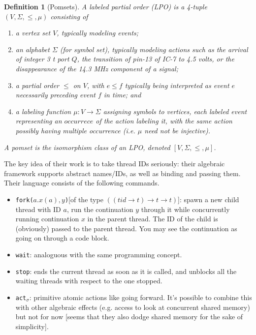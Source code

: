 \documentclass[12pt]{extarticle}
\newtheorem{defn}{Definition}[section]
\begin{document}
\begin{defn}[Pomsets]
    A \emph{labeled partial order (LPO)} is a 4-tuple \((V, \Sigma, \leqslant, \mu)\) consisting of 
    \begin{enumerate}
        \item a \emph{vertex set} \(V\), typically modeling \emph{events};
        \item an \emph{alphabet} \(\Sigma\) (for symbol set), typically modeling \emph{actions} such as the arrival of integer 3 t port \(Q\), the transition of pin-13 of IC-7 to 4.5 volts, or the disappearance of the 14.3 MHz component of a signal;
        \item a \emph{partial order} \(\leqslant\) on \(V\), with \(e \leqslant f\) typically being interpreted as event \(e\) necessarily preceding event \(f\) in time; and 
        \item a \emph{labeling function} \(\mu : V \rightarrow \Sigma\) assigning symbols to vertices, each labeled event representing an \(occurrece\) of the action labeling it, with the same action possibly having multiple occurrence (i.e. \(\mu\) need not be injective).
    \end{enumerate}
    A \emph{pomset} is the isomorphism class of an LPO, denoted \([V, \Sigma, \leqslant, \mu]\).
\end{defn}

The key idea of their work is to take thread IDs seriously: their algebraic framework supports abstract names/IDs, as well as binding and passing them. 
Their language consists of the following commands.
\begin{itemize}
    \item \texttt{fork(\(a.x(a), y\))}[of the type \texttt{\(((tid \rightarrow t) \rightarrow t \rightarrow t)\)}]: spawn a new child thread with ID \(a\), run the continuation \(y\) through it while concurrently running continuation \(x\) in the parent thread. The ID of the child is (obviously) passed to the parent thread. You may see the continuation as going on through a code block.
    \item \texttt{wait}: analoguous with the same programming concept.
    \item \texttt{stop}: ends the current thread as soon as it is called, and unblocks all the waiting threads with respect to the one stopped.
    \item \texttt{act}\(_\sigma\): primitive atomic actions like going forward. It's possible to combine this with other algebraic effects (e.g. access to look at concurrent shared memory) but not for now [seems that they also dodge shared memory for the sake of simplicity].
\end{itemize}
\end{document}
